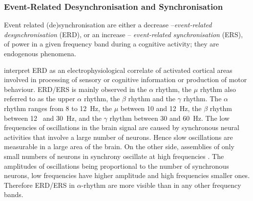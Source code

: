 \subsubsection{Event-Related Desynchronisation and Synchronisation}

%
Event related (de)synchronisation are either a decrease --\emph{event-related desynchronisation} (ERD), or an increase -- \emph{event-related synchronisation} (ERS), of power in a given frequency band during a cognitive activity\citep{pfurtscheller_graphical_1977, pfurtscheller_event-related_1977, pfurtscheller_event-related_1994}; they are endogenous phenomena. 

\par \cite{pfurtscheller_event-related_1999} interpret ERD as an electrophysiological correlate of activated cortical areas involved in processing of sensory or cognitive information or production of motor behaviour. 
ERD/ERS is mainly observed in the 
$\alpha$ rhythm, the $\mu$ rhythm also referred to as the upper $\alpha$ rhythm, the $\beta$ rhythm and the $\gamma$ rhythm.
The $\alpha$ rhythm ranges from 8 to 12~Hz, the $\mu$ between 10 and 12~Hz, the $\beta$ rhythm between 12~ and 30~Hz, 
and the $\gamma$ rhythm between 30 and 60~Hz.
The low frequencies of oscillations in the brain signal are caused by synchronous neural activities that involve a large number of neurons. 
Hence slow oscillations are measurable in a large area of the brain. 
On the other side, assemblies of only small numbers of neurons in synchrony  oscillate at high frequencies \citep{singer_synchronization_1993}.  
The amplitudes of oscillations being proportional to the number of synchronous neurons, low frequencies have higher amplitude and high frequencies smaller ones. Therefore ERD/ERS in $\alpha$-rhythm are more visible than in any other
frequency bands.%


